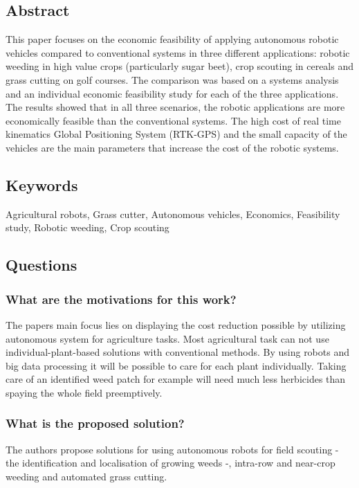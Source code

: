 \documentclass{article}
\begin{document}
\subsection*{Abstract}
This  paper focuses  on  the  economic  feasibility of  applying  autonomous robotic  vehicles  compared  to  conventional  systems  in  three  different  applications: robotic weeding in high value crops (particularly sugar beet), crop scouting in cereals and grass cutting on golf courses. The comparison was based on a systems analysis and an individual economic feasibility study for each of the three applications. The results  showed  that  in  all  three  scenarios,  the  robotic  applications  are  more  economically feasible than the conventional systems. The high cost of real time kinematics Global Positioning System (RTK-GPS) and the small capacity of the vehicles are the main parameters that increase the cost of the robotic systems.

\subsection*{Keywords}
Agricultural robots, Grass cutter, Autonomous vehicles, Economics, Feasibility study, Robotic weeding, Crop scouting

\subsection*{Questions}

\subsubsection*{What are the motivations for this work?}
The papers main focus lies on displaying the cost reduction possible by utilizing 
autonomous system for agriculture tasks. Most agricultural task can not use individual-plant-based solutions with
conventional methods. By using robots and big data processing it will be possible to care for each plant individually.
Taking care of an identified weed patch for example will need much less herbicides than spaying the whole field preemptively.
\subsubsection*{What is the proposed solution?}
The authors propose solutions for using autonomous robots for field scouting - the identification and localisation 
of growing weeds -, intra-row and near-crop weeding and automated grass cutting. 
\end{document}
